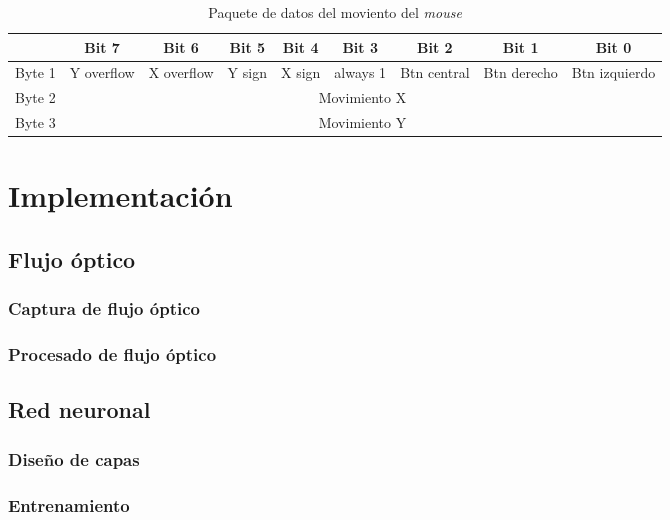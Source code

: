 \documentclass{iccmemoria}
\begin{document}
\begin{table}
\begin{adjustwidth*}{-3cm}{-3cm}
\begin{tabular}{|c|c|c|c|c|c|c|c|c|}

\hline
	 & Bit 7 & Bit 6 & Bit 5 & Bit 4 & Bit 3 & Bit 2 & Bit 1 & Bit 0\\
\hline
	Byte 1 & Y overflow & X overflow & Y sign & X sign & always 1 & Btn central & Btn derecho & Btn izquierdo\\
\hline
	Byte 2 & \multicolumn{8}{c|}{Movimiento X}\\
\hline
	Byte 3 & \multicolumn{8}{c|}{Movimiento Y}\\
\hline
\end{tabular}
\caption{Paquete de datos del moviento del \emph{mouse}}
\label{tab:ps/2 package}
\end{adjustwidth*}
\end{table}

\chapter{Implementación}

\section{Flujo óptico}

\subsection{Captura de flujo óptico}

\subsection{Procesado de flujo óptico}

\section{Red neuronal}

\subsection{Diseño de capas}

\subsection{Entrenamiento}
\end{document}
